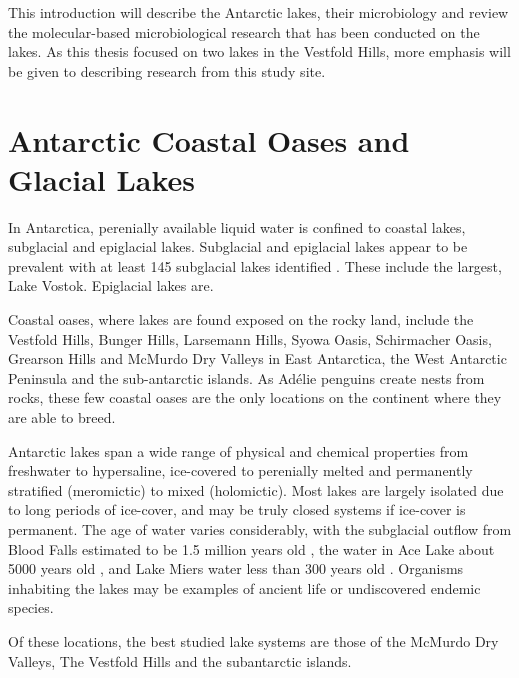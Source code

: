 This introduction will describe the Antarctic lakes, their microbiology and review the molecular-based microbiological research that has been conducted on the lakes.
As this thesis focused on two lakes in the Vestfold Hills, more emphasis will be given to describing research from this study site.


\section{Antarctic Coastal Oases and Glacial Lakes}
\label{in:oases}
In Antarctica, perenially available liquid water is confined to coastal lakes, subglacial and epiglacial lakes.
Subglacial and epiglacial lakes appear to be prevalent with at least 145 subglacial lakes identified \cite{Siegert2005}.%
These include the largest, Lake Vostok. %
Epiglacial lakes are. %

Coastal oases, where lakes are found exposed on the rocky land, include the Vestfold Hills, Bunger Hills, Larsemann Hills, Syowa Oasis, Schirmacher Oasis, Grearson Hills and McMurdo Dry Valleys
 in East Antarctica, the West Antarctic Peninsula and the sub-antarctic islands.
As Ad\'{e}lie penguins create nests from rocks, these few coastal oases are the only locations on the continent where they are able to breed.

Antarctic lakes span a wide range of physical and chemical properties from freshwater to hypersaline, ice-covered to perenially melted and permanently stratified (meromictic) to mixed (holomictic).
Most lakes are largely isolated due to long periods of ice-cover, and may be truly closed systems if ice-cover is permanent.
The age of water varies considerably, with the subglacial outflow from Blood Falls estimated to be 1.5 million years old \cite{Mickucki2009}, the water in Ace Lake about 5000 years old
 \cite{Rankin1999}, and Lake Miers water less than 300 years old \cite{Green1988}. %
Organisms inhabiting the lakes may be examples of ancient life or undiscovered endemic species.

Of these locations, the best studied lake systems are those of the McMurdo Dry Valleys, The Vestfold Hills and the subantarctic islands.

